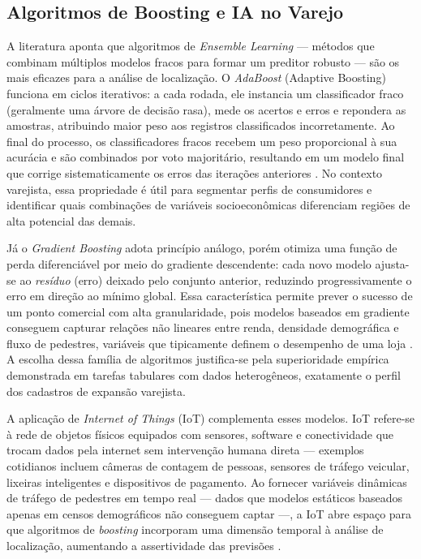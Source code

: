 \subsection{\esp Algoritmos de Boosting e IA no Varejo} \label{subsec:algoritmos}
A literatura aponta que algoritmos de \textit{Ensemble Learning} — métodos que combinam múltiplos modelos fracos para formar um preditor robusto — são os mais eficazes para a análise de localização. O \textit{AdaBoost} (Adaptive Boosting) funciona em ciclos iterativos: a cada rodada, ele instancia um classificador fraco (geralmente uma árvore de decisão rasa), mede os acertos e erros e repondera as amostras, atribuindo maior peso aos registros classificados incorretamente. Ao final do processo, os classificadores fracos recebem um peso proporcional à sua acurácia e são combinados por voto majoritário, resultando em um modelo final que corrige sistematicamente os erros das iterações anteriores \cite{peri2025}. No contexto varejista, essa propriedade é útil para segmentar perfis de consumidores e identificar quais combinações de variáveis socioeconômicas diferenciam regiões de alta potencial das demais.

Já o \textit{Gradient Boosting} adota princípio análogo, porém otimiza uma função de perda diferenciável por meio do gradiente descendente: cada novo modelo ajusta-se ao \textit{resíduo} (erro) deixado pelo conjunto anterior, reduzindo progressivamente o erro em direção ao mínimo global. Essa característica permite prever o sucesso de um ponto comercial com alta granularidade, pois modelos baseados em gradiente conseguem capturar relações não lineares entre renda, densidade demográfica e fluxo de pedestres, variáveis que tipicamente definem o desempenho de uma loja \cite{nair2022}. A escolha dessa família de algoritmos justifica-se pela superioridade empírica demonstrada em tarefas tabulares com dados heterogêneos, exatamente o perfil dos cadastros de expansão varejista.

A aplicação de \textit{Internet of Things} (IoT) complementa esses modelos. IoT refere-se à rede de objetos físicos equipados com sensores, software e conectividade que trocam dados pela internet sem intervenção humana direta — exemplos cotidianos incluem câmeras de contagem de pessoas, sensores de tráfego veicular, lixeiras inteligentes e dispositivos de pagamento. Ao fornecer variáveis dinâmicas de tráfego de pedestres em tempo real — dados que modelos estáticos baseados apenas em censos demográficos não conseguem captar —, a IoT abre espaço para que algoritmos de \textit{boosting} incorporam uma dimensão temporal à análise de localização, aumentando a assertividade das previsões \cite{leung2020, wang2024}.


